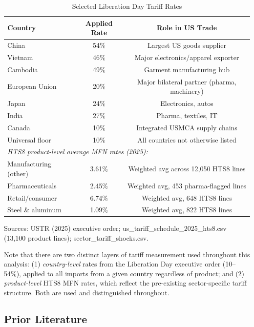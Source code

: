 \documentclass[12pt]{article}
\begin{document}
\begin{table}[H]
\centering
\caption{Selected Liberation Day Tariff Rates}
\label{tab:tariff_selected}
\begin{tabular}{lcc}
\toprule
Country & Applied Rate & Role in US Trade \\
\midrule
China        & 54\% & Largest US goods supplier \\
Vietnam      & 46\% & Major electronics/apparel exporter \\
Cambodia     & 49\% & Garment manufacturing hub \\
European Union & 20\% & Major bilateral partner (pharma, machinery) \\
Japan        & 24\% & Electronics, autos \\
India        & 27\% & Pharma, textiles, IT \\
Canada       & 10\% & Integrated USMCA supply chains \\
Universal floor & 10\% & All countries not otherwise listed \\
\midrule
\multicolumn{3}{l}{\textit{HTS8 product-level average MFN rates (2025):}} \\
Manufacturing (other) & 3.61\% & Weighted avg across 12,050 HTS8 lines \\
Pharmaceuticals & 2.45\% & Weighted avg, 453 pharma-flagged lines \\
Retail/consumer & 6.74\% & Weighted avg, 648 HTS8 lines \\
Steel \& aluminum & 1.09\% & Weighted avg, 822 HTS8 lines \\
\bottomrule
\end{tabular}
\begin{tablenotes}
\small
\item Sources: USTR (2025) executive order; us\_tariff\_schedule\_2025\_hts8.csv
(13,100 product lines); sector\_tariff\_shocks.csv.
\end{tablenotes}
\end{table}

\noindent
Note that there are two distinct layers of tariff measurement used throughout
this analysis: (1) \emph{country-level} rates from the Liberation Day executive
order (10--54\%), applied to all imports from a given country regardless of
product; and (2) \emph{product-level} HTS8 MFN rates, which reflect
the pre-existing sector-specific tariff structure. Both are used and
distinguished throughout.

\subsection{Prior Literature}
\end{document}
